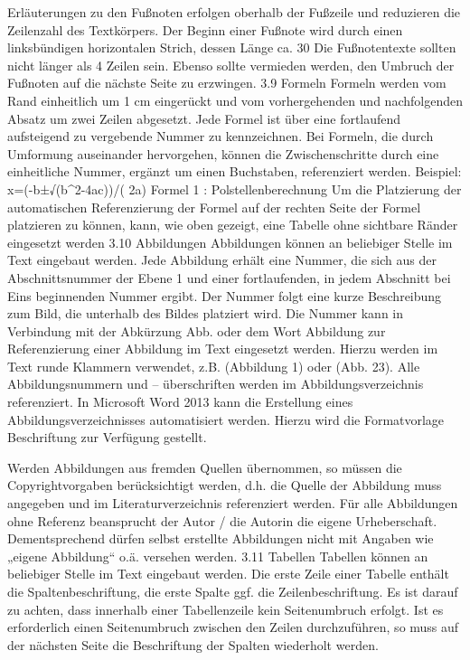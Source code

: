 	Erläuterungen zu den Fußnoten erfolgen oberhalb der Fußzeile und reduzieren die Zeilenzahl des Textkörpers. Der Beginn einer Fußnote wird durch einen linksbündigen horizontalen Strich, dessen Länge ca. 30%
	Die Fußnotentexte sollten nicht länger als 4 Zeilen sein. Ebenso sollte vermieden werden, den Umbruch der Fußnoten auf die nächste Seite zu erzwingen.
	3.9	Formeln
	Formeln werden vom Rand einheitlich um 1 cm eingerückt und vom vorhergehenden und nachfolgenden Absatz um zwei Zeilen abgesetzt. Jede Formel ist über eine fortlaufend aufsteigend zu vergebende Nummer zu kennzeichnen. Bei Formeln, die durch Umformung auseinander hervorgehen, können die Zwischenschritte durch eine einheitliche Nummer, ergänzt um einen Buchstaben, referenziert werden.
	Beispiel:
	x=(-b±√(b^2-4ac))/( 2a)
	Formel 1 : Polstellenberechnung
	Um die Platzierung der automatischen Referenzierung der Formel auf der rechten Seite der Formel platzieren zu können, kann, wie oben gezeigt, eine Tabelle ohne sichtbare Ränder eingesetzt werden
	3.10	Abbildungen
	Abbildungen können an beliebiger Stelle im Text eingebaut werden. Jede Abbildung erhält eine Nummer, die sich aus der Abschnittsnummer der Ebene 1 und einer fortlaufenden, in jedem Abschnitt bei Eins beginnenden Nummer ergibt. Der Nummer folgt eine kurze Beschreibung zum Bild, die unterhalb des Bildes platziert wird. Die Nummer kann in Verbindung mit der Abkürzung Abb. oder dem Wort Abbildung zur Referenzierung einer Abbildung im Text eingesetzt werden. Hierzu werden im Text runde Klammern verwendet, z.B. (Abbildung 1) oder (Abb. 23).
	Alle Abbildungsnummern und – überschriften werden im Abbildungsverzeichnis referenziert. In Microsoft Word 2013 kann die Erstellung eines Abbildungsverzeichnisses automatisiert werden. Hierzu wird die Formatvorlage Beschriftung zur Verfügung gestellt.



	Werden Abbildungen aus fremden Quellen übernommen, so müssen die Copyrightvorgaben berücksichtigt werden, d.h. die Quelle der Abbildung muss angegeben und im Literaturverzeichnis referenziert werden. Für alle Abbildungen ohne Referenz beansprucht der Autor / die Autorin die eigene Urheberschaft. Dementsprechend dürfen selbst erstellte Abbildungen nicht mit Angaben wie „eigene Abbildung“ o.ä. versehen werden.
	3.11	Tabellen
	Tabellen können an beliebiger Stelle im Text eingebaut werden. Die erste Zeile einer Tabelle enthält die Spaltenbeschriftung, die erste Spalte ggf. die Zeilenbeschriftung.
	Es ist darauf zu achten, dass innerhalb einer Tabellenzeile kein Seitenumbruch erfolgt. Ist es erforderlich einen Seitenumbruch zwischen den Zeilen durchzuführen, so muss auf der nächsten Seite die Beschriftung der Spalten wiederholt werden.

